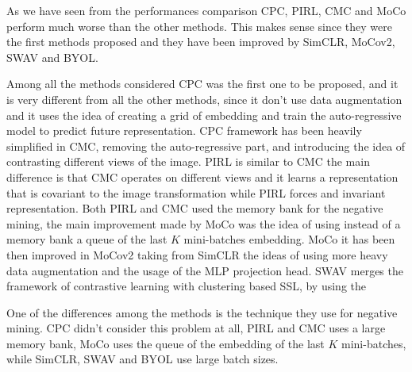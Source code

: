 As we have seen from the performances comparison CPC, PIRL, CMC and MoCo perform much worse than the other methods. This makes sense since they were the first methods proposed and they have been improved by SimCLR, MoCov2, SWAV and BYOL. 

Among all the methods considered CPC was the first one to be proposed, and it is very different from all the other methods, since it don't use data augmentation and it uses the idea of creating a grid of embedding and train the auto-regressive model to predict future representation. CPC framework has been heavily simplified in CMC, removing the auto-regressive part, and introducing the idea of contrasting different views of the image. PIRL is similar to CMC the main difference is that CMC operates on different views and it learns a representation that is covariant to the image transformation while PIRL forces and invariant representation. Both PIRL and CMC used the memory bank for the negative mining, the main improvement made by MoCo was the idea of using instead of a memory bank a queue of the last $K$ mini-batches embedding. MoCo it has been then improved in MoCov2 taking from SimCLR the ideas of using more heavy data augmentation and the usage of the MLP projection head. SWAV merges the framework of contrastive learning with clustering based SSL, by using the 

One of the differences among the methods is the technique they use for negative mining. CPC didn't consider this problem at all, PIRL and CMC uses a large memory bank, MoCo uses the queue of the embedding of the last $K$ mini-batches, while SimCLR, SWAV and BYOL use large batch sizes.